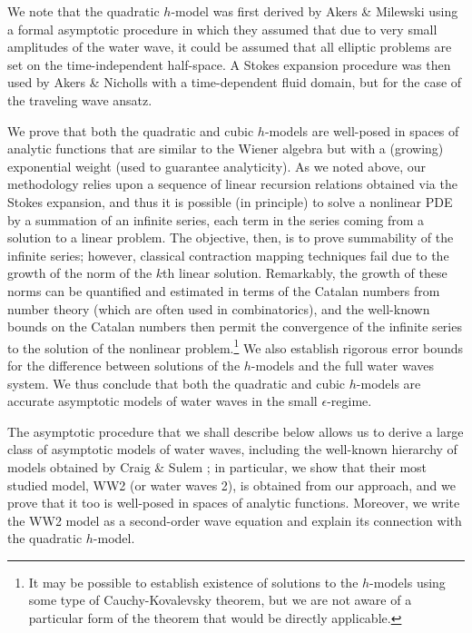 \documentclass[11pt]{article}
\theoremstyle{plain}
\theoremstyle{definition}
\theoremstyle{definition}
\begin{document}
 
We note that the quadratic $h$-model was  first derived by Akers \& Milewski \cite{AkMi2010} using a formal asymptotic procedure in which they
assumed that due to very small amplitudes of the water wave, it could be assumed that all elliptic problems are set on the time-independent half-space.
  A Stokes expansion procedure was then used by Akers \& Nicholls  \cite{AkNi2010} with a time-dependent fluid domain,
but for the case of the traveling wave ansatz.  

 
We prove that both the quadratic and cubic $h$-models  are well-posed in  spaces of analytic functions that are similar to the
Wiener algebra but with a (growing) exponential weight (used to guarantee analyticity).   As we noted above, our methodology relies upon a sequence of
linear recursion relations obtained via the Stokes expansion, and thus it is possible (in principle) to solve a nonlinear PDE by a summation of an infinite series, each term in the series coming from a 
solution to a linear problem.   The objective, then, is to prove summability of the infinite series; however, classical contraction mapping techniques fail due to the
growth of the norm of the  $k$th linear solution.   Remarkably, the growth of these norms can be quantified and estimated in terms of the 
Catalan numbers \cite{St2015} from number theory (which are often used in combinatorics), and the well-known bounds on the Catalan numbers then permit the convergence of the infinite
series to the solution of the nonlinear problem.\footnote{It may be possible to establish existence of solutions to the $h$-models using some type of 
Cauchy-Kovalevsky theorem, but we are not aware of a particular form of the theorem that would be directly applicable.}
We also establish  rigorous error bounds for the difference between solutions of the $h$-models and the full water waves system.
We thus conclude that both the quadratic and cubic  $h$-models are accurate asymptotic models of water waves in  the small $ \epsilon $-regime.


The asymptotic procedure that we shall describe below allows us to derive a large class of asymptotic models of water waves, including the well-known
hierarchy of models obtained by Craig \& Sulem \cite{CrSu1993}; in particular, we show that their most studied model, WW2 (or water waves 2),  is obtained from
our approach, and we prove that it too is well-posed  in  spaces of analytic functions.   Moreover, we write the WW2 model as a second-order wave equation and
explain its connection with the quadratic $h$-model.
\end{document}
